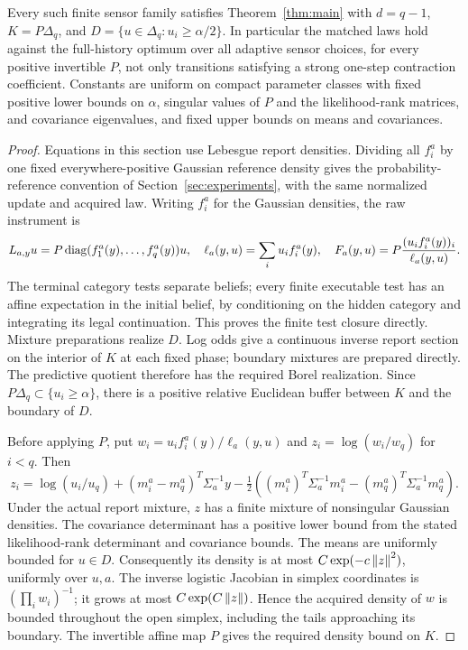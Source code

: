 \begin{theorem}\label{thm:gaussian}
Every such finite sensor family satisfies Theorem~\ref{thm:main} with $d=q-1$, $K=P\Delta_q$, and $D=\{u\in\Delta_q:u_i\ge\alpha/2\}$. In particular the matched laws hold against the full-history optimum over all adaptive sensor choices, for every positive invertible $P$, not only transitions satisfying a strong one-step contraction coefficient. Constants are uniform on compact parameter classes with fixed positive lower bounds on $\alpha$, singular values of $P$ and the likelihood-rank matrices, and covariance eigenvalues, and fixed upper bounds on means and covariances.
\end{theorem}
\begin{proof}
Equations in this section use Lebesgue report densities. Dividing all $f_i^a$ by one fixed everywhere-positive Gaussian reference density gives the probability-reference convention of Section~\ref{sec:experiments}, with the same normalized update and acquired law. Writing $f_i^a$ for the Gaussian densities, the raw instrument is
\begin{equation}\label{eq:gauss-raw}
 L_{a,y}u=P\operatorname{diag}(f_1^a(y),\ldots,f_q^a(y))u,\quad
 \ell_a(y,u)=\sum_i u_if_i^a(y),\quad
 F_a(y,u)=P\frac{(u_if_i^a(y))_i}{\ell_a(y,u)}.
\end{equation}
The terminal category tests separate beliefs; every finite executable test has an affine expectation in the initial belief, by conditioning on the hidden category and integrating its legal continuation. This proves the finite test closure directly. Mixture preparations realize $D$. Log odds give a continuous inverse report section on the interior of $K$ at each fixed phase; boundary mixtures are prepared directly. The predictive quotient therefore has the required Borel realization. Since $P\Delta_q\subset\{u_i\ge\alpha\}$, there is a positive relative Euclidean buffer between $K$ and the boundary of $D$.

Before applying $P$, put $w_i=u_if_i^a(y)/\ell_a(y,u)$ and $z_i=\log(w_i/w_q)$ for $i<q$. Then
\begin{equation}\label{eq:logodds}
 z_i=\log(u_i/u_q)+(m_i^a-m_q^a)^T\Sigma_a^{-1}y
 -\tfrac12\left((m_i^a)^T\Sigma_a^{-1}m_i^a
                      -(m_q^a)^T\Sigma_a^{-1}m_q^a\right).
\end{equation}
Under the actual report mixture, $z$ has a finite mixture of nonsingular Gaussian densities. The covariance determinant has a positive lower bound from the stated likelihood-rank determinant and covariance bounds. The means are uniformly bounded for $u\in D$. Consequently its density is at most $C\exp(-c\left\lVert z\right\rVert^2)$, uniformly over $u,a$. The inverse logistic Jacobian in simplex coordinates is $(\prod_iw_i)^{-1}$; it grows at most $C\exp(C\left\lVert z\right\rVert)$. Hence the acquired density of $w$ is bounded throughout the open simplex, including the tails approaching its boundary. The invertible affine map $P$ gives the required density bound on $K$.


\end{proof}
